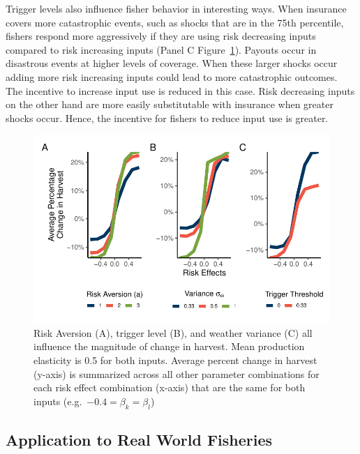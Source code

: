 \documentclass[
  letterpaper,
  DIV=11,
  numbers=noendperiod]{scrartcl}
\theoremstyle{plain}
\theoremstyle{plain}
\theoremstyle{remark}
\begin{document}
Trigger levels also influence fisher behavior in interesting ways. When
insurance covers more catastrophic events, such as shocks that are in
the 75th percentile, fishers respond more aggressively if they are using
risk decreasing inputs compared to risk increasing inputs (Panel C
Figure~\ref{fig-multi-para}). Payouts occur in disastrous events at
higher levels of coverage. When these larger shocks occur adding more
risk increasing inputs could lead to more catastrophic outcomes. The
incentive to increase input use is reduced in this case. Risk decreasing
inputs on the other hand are more easily substitutable with insurance
when greater shocks occur. Hence, the incentive for fishers to reduce
input use is greater.

\begin{figure}

{\centering \includegraphics{ibi-behavior_files/figure-pdf/fig-multi-para-1.pdf}

}

\caption{\label{fig-multi-para}Risk Aversion (A), trigger level (B), and
weather variance (C) all influence the magnitude of change in harvest.
Mean production elasticity is 0.5 for both inputs. Average percent
change in harvest (y-axis) is summarized across all other parameter
combinations for each risk effect combination (x-axis) that are the same
for both inputs (e.g.~\(-0.4=\beta_k=\beta_l\))}

\end{figure}

\hypertarget{application-to-real-world-fisheries}{%
\subsection{Application to Real World
Fisheries}\label{application-to-real-world-fisheries}}
\end{document}
